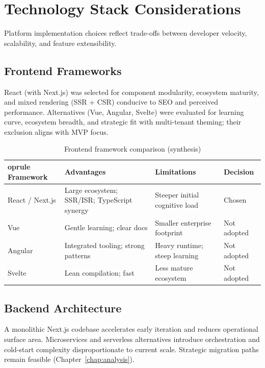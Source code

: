 \section{Technology Stack Considerations}\label{sec:tech-stack}
Platform implementation choices reflect trade-offs between developer velocity, scalability, and feature extensibility.

\subsection{Frontend Frameworks}
React (with Next.js) was selected for component modularity, ecosystem maturity, and mixed rendering (SSR + CSR) conducive to SEO and perceived performance. Alternatives (Vue, Angular, Svelte) were evaluated for learning curve, ecosystem breadth, and strategic fit with multi-tenant theming; their exclusion aligns with MVP focus.

\begin{table}[ht]
  \caption{Frontend framework comparison (synthesis)}\label{tab:frontend}
  \centering
  \begin{tabular}{p{2.6cm}p{4.2cm}p{4.2cm}p{2cm}}
    	oprule
    Framework & Advantages & Limitations & Decision \\
    \midrule
    React / Next.js & Large ecosystem; SSR/ISR; TypeScript synergy & Steeper initial cognitive load & Chosen \\
    Vue & Gentle learning; clear docs & Smaller enterprise footprint & Not adopted \\
    Angular & Integrated tooling; strong patterns & Heavy runtime; steep learning & Not adopted \\
    Svelte & Lean compilation; fast & Less mature ecosystem & Not adopted \\
    \bottomrule
  \end{tabular}
\end{table}

\subsection{Backend Architecture}
A monolithic Next.js codebase accelerates early iteration and reduces operational surface area. Microservices and serverless alternatives introduce orchestration and cold-start complexity disproportionate to current scale. Strategic migration paths remain feasible (Chapter~\ref{chap:analysis}).

